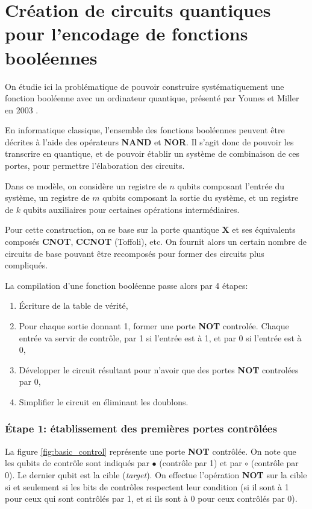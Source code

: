 \chapter{Création de circuits quantiques pour l’encodage de fonctions booléennes}
\label{appendix:ConstructionCircuit}

On étudie ici la problématique de pouvoir construire systématiquement une fonction booléenne avec un ordinateur quantique, présenté par Younes et Miller en 2003 \cite{Younes03}.

En informatique classique, l'ensemble des fonctions booléennes peuvent être décrites à l'aide des opérateurs \textbf{NAND} et \textbf{NOR}. Il s'agit donc de pouvoir les transcrire en quantique, et de pouvoir établir un système de combinaison de ces portes, pour permettre l'élaboration des circuits.

Dans ce modèle, on considère un registre de $n$ qubits composant l'entrée du système, un registre de $m$ qubits composant la sortie du système, et un registre de $k$ qubits auxiliaires pour certaines opérations intermédiaires.

Pour cette construction, on se base sur la porte quantique \textbf{X} et ses équivalents composés \textbf{CNOT}, \textbf{CCNOT} (Toffoli), etc. On fournit alors un certain nombre de circuits de base pouvant être recomposés pour former des circuits plus compliqués.

La compilation d'une fonction booléenne passe alors par 4 étapes:

\begin{enumerate}
    \item \'Ecriture de la table de vérité,
    \item Pour chaque sortie donnant 1, former une porte \textbf{NOT} controlée. Chaque entrée va servir de contrôle, par 1 si l'entrée est à 1, et par 0 si l'entrée est à 0,
    \item Développer le circuit résultant pour n'avoir que des portes \textbf{NOT} controlées par 0,
    \item Simplifier le circuit en éliminant les doublons.
\end{enumerate}

\subsection*{\'Etape 1: établissement des premières portes contrôlées}
La figure \ref{fig:basic_control} représente une porte \textbf{NOT} contrôlée. On note que les qubits de contrôle sont indiqués par $\bullet$ (contrôle par 1) et par $\circ$ (contrôle par 0). Le dernier qubit est la cible (\textit{target}). On effectue l'opération \textbf{NOT} sur la cible si et seulement si les bits de contrôles respectent leur condition (si il sont à 1 pour ceux qui sont contrôlés par 1, et si ils sont à 0 pour ceux contrôlés par 0).

